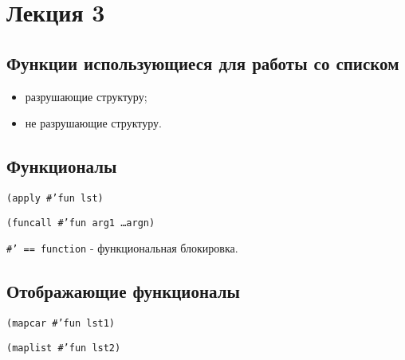 \chapter{Лекция 3}

\section{Функции использующиеся для работы со списком}

\begin{itemize}
    \item разрушающие структуру;
    \item не разрушающие структуру.
\end{itemize}

\section{Функционалы}

\texttt{(apply #'fun lst)}

\texttt{(funcall #'fun arg1 \dots argn)}

\texttt{#' == function} - функциональная блокировка.

\section{Отображающие функционалы}

\texttt{(mapcar #'fun lst1)}

\texttt{(maplist #'fun lst2)}
